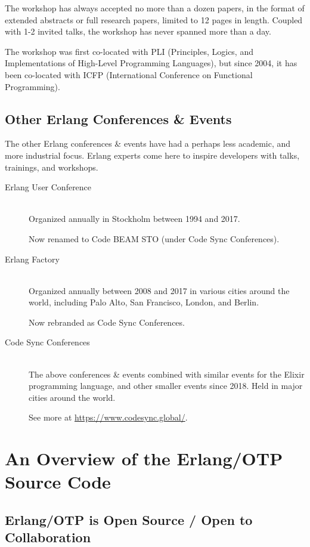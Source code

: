 The workshop has always accepted no more than a dozen papers, in the
format of extended abstracts or full research papers, limited to 12
pages in length.  Coupled with 1-2 invited talks, the workshop has
never spanned more than a day.

The workshop was first co-located with PLI (Principles, Logics, and
Implementations of High-Level Programming Languages), but since 2004,
it has been co-located with ICFP (International Conference on
Functional Programming).

\subsection{Other Erlang Conferences \& Events}

The other Erlang conferences \& events have had a perhaps less
academic, and more industrial focus. Erlang experts come here to
inspire developers with talks, trainings, and workshops.

\begin{description}

\item[Erlang User Conference]\ \\ Organized annually in Stockholm
between 1994 and 2017.

Now renamed to Code BEAM STO (under Code Sync Conferences).

\item[Erlang Factory]\ \\ Organized annually between 2008 and 2017 in
various cities around the world, including Palo Alto, San Francisco,
London, and Berlin.

Now rebranded as Code Sync Conferences.

\item[Code Sync Conferences]\ \\ The above conferences \& events
combined with similar events for the Elixir programming language, and
other smaller events since 2018. Held in major cities around the
world.

See more at \url{https://www.codesync.global/}.

\end{description}

\section{An Overview of the Erlang/OTP Source Code}
\label{app:overview-of-erlang-source}

\subsection{Erlang/OTP is Open Source / Open to Collaboration}


